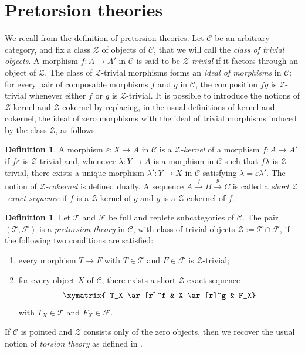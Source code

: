 \documentclass[a4paper,10pt,reqno]{amsart}
\theoremstyle{definition}
\newtheorem{definition}[theorem]{Definition}
\theoremstyle{remark}
\newcommand{\Cal}[1]{\mathcal{#1}}
\begin{document}
\section{Pretorsion theories}\label{sec:pretorsion}

We recall from \cite{FFG} the definition of pretorsion theories.
Let $\Cal C$ be an arbitrary category, and fix a class $\Cal Z$ of objects of $\Cal C$, that we will call the {\em class of trivial objects}. A morphism $f\colon A\to A'$ in $\Cal C$ is said to be \textit{$\Cal Z$-trivial} if it factors through an object of $\Cal Z$. The class of $\Cal Z$-trivial morphisms forms an {\em ideal of morphisms} in $\Cal C$: for every pair of composable morphisms $f$ and $g$ in $\Cal C$, the composition $fg$ is $\Cal Z$-trivial whenever either $f$ or $g$ is $\Cal Z$-trivial. It is possible to introduce the notions of $\mathcal Z$-kernel and $\mathcal Z$-cokernel by replacing, in the usual definitions of kernel and cokernel, the ideal of zero morphisms with the ideal of trivial morphisms induced by the class $\mathcal Z$, as follows.

\begin{definition}
A morphism $\varepsilon\colon X\to A$ in $\Cal C$ is a \emph{$\Cal Z$-kernel} of a morphism $f\colon A \to A'$ if $f\varepsilon$ is $\Cal Z$-trivial and, whenever $\lambda \colon Y\to A$ is a morphism in $\Cal C$ such that $f\lambda$ is $\Cal Z$-trivial, there exists a unique morphism $\lambda'\colon Y\to X$ in $\Cal C$ satisfying $\lambda=\varepsilon\lambda'$.
The notion of \emph{$\Cal Z$-cokernel} is defined dually. A sequence $A\overset{f}{\to}B\overset{g}{\to}C$ is called a \emph{short $\Cal Z$-exact sequence} if $f$ is a $\Cal Z$-kernel of $g$ and $g$ is a $\Cal Z$-cokernel of $f$.
\end{definition}

\begin{definition}\label{def:pretorsion}
Let $\Cal T$ and $\Cal F$ be full and replete subcategories of $\Cal C$.
The pair $(\Cal T,\Cal F)$ is a \emph{pretorsion theory} in $\Cal C$, with class of trivial objects $\Cal Z:=\Cal T\cap \Cal F$, if the following two conditions are satisfied:
\begin{enumerate}[label=\textup{(\roman*)}]
\item every morphism $T\to F$ with $T \in \Cal T$ and $F \in \Cal F$ is $\Cal Z$-trivial;
\item for every object $X$ of $\Cal C$, there exists a short $\Cal Z$-exact sequence
$$\xymatrix{ T_X \ar[r]^f & X \ar[r]^g & F_X}$$
with $T_X\in\Cal T$ and $F_X\in\Cal F$.
\end{enumerate}
If $\Cal C$ is pointed and $\Cal Z$ consists only of the zero objects, then we recover the usual notion of {\em torsion theory} as defined in \cite{D, JT}.
\end{definition}
\end{document}
